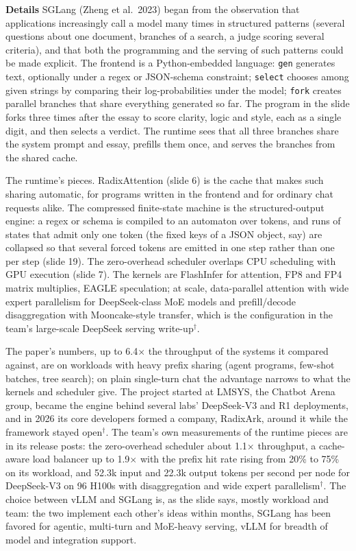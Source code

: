 \documentclass[11pt,letterpaper]{article}
\newcommand{\para}[1]{\medskip\noindent\textbf{#1}\quad}
\begin{document}
\para{Details} SGLang (Zheng et al.\ 2023) began from the observation that applications increasingly call a model many times in structured patterns (several questions about one document, branches of a search, a judge scoring several criteria), and that both the programming and the serving of such patterns could be made explicit. The frontend is a Python-embedded language: \texttt{gen} generates text, optionally under a regex or JSON-schema constraint; \texttt{select} chooses among given strings by comparing their log-probabilities under the model; \texttt{fork} creates parallel branches that share everything generated so far. The program in the slide forks three times after the essay to score clarity, logic and style, each as a single digit, and then selects a verdict. The runtime sees that all three branches share the system prompt and essay, prefills them once, and serves the branches from the shared cache.

The runtime's pieces. RadixAttention (slide 6) is the cache that makes such sharing automatic, for programs written in the frontend and for ordinary chat requests alike. The compressed finite-state machine is the structured-output engine: a regex or schema is compiled to an automaton over tokens, and runs of states that admit only one token (the fixed keys of a JSON object, say) are collapsed so that several forced tokens are emitted in one step rather than one per step (slide 19). The zero-overhead scheduler overlaps CPU scheduling with GPU execution (slide 7). The kernels are FlashInfer for attention, FP8 and FP4 matrix multiplies, EAGLE speculation; at scale, data-parallel attention with wide expert parallelism for DeepSeek-class MoE models and prefill/decode disaggregation with Mooncake-style transfer, which is the configuration in the team's large-scale DeepSeek serving write-up$^\dagger$.

The paper's numbers, up to 6.4$\times$ the throughput of the systems it compared against, are on workloads with heavy prefix sharing (agent programs, few-shot batches, tree search); on plain single-turn chat the advantage narrows to what the kernels and scheduler give. The project started at LMSYS, the Chatbot Arena group, became the engine behind several labs' DeepSeek-V3 and R1 deployments, and in 2026 its core developers formed a company, RadixArk, around it while the framework stayed open$^\dagger$. The team's own measurements of the runtime pieces are in its release posts: the zero-overhead scheduler about 1.1$\times$ throughput, a cache-aware load balancer up to 1.9$\times$ with the prefix hit rate rising from 20\% to 75\% on its workload, and 52.3k input and 22.3k output tokens per second per node for DeepSeek-V3 on 96 H100s with disaggregation and wide expert parallelism$^\dagger$. The choice between vLLM and SGLang is, as the slide says, mostly workload and team: the two implement each other's ideas within months, SGLang has been favored for agentic, multi-turn and MoE-heavy serving, vLLM for breadth of model and integration support.
\end{document}
